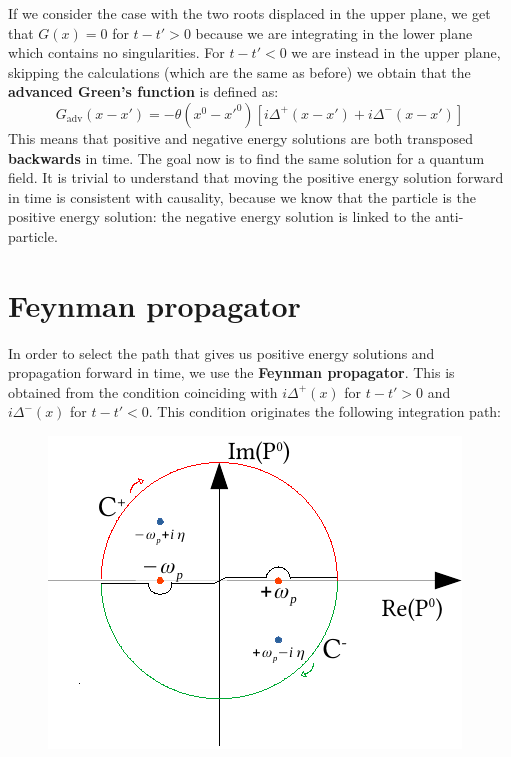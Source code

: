 \documentclass[../main.tex]{subfiles}
\begin{document}
If we consider the case with the two roots displaced in the upper plane, we get that $G(x)=0$ for $t-t'>0$ because we are integrating in the lower plane which contains no singularities. For $t-t'<0$ we are instead in the upper plane, skipping the calculations (which are the same as before) we obtain that the \textbf{advanced Green's function} is defined as:
\[
G_{\text{adv}}(x-x')=-\theta(x^0-x'^0)[i\Delta^+(x-x')+i\Delta^-(x-x')]
\]
This means that positive and negative energy solutions are both transposed \textbf{backwards} in time. The goal now is to find the same solution for a quantum field. It is trivial to understand that moving the positive energy solution forward in time is consistent with causality, because we know that the particle is the positive energy solution: the negative energy solution is linked to the anti-particle.
\section{Feynman propagator}
In order to select the path that gives us positive energy solutions and propagation forward in time, we use the \textbf{Feynman propagator}. This is obtained from the condition coinciding with $i\Delta^+(x)$ for $t-t'>0$ and $i\Delta^-(x)$ for $t-t'<0$. This condition originates the following integration path:
\begin{figure}[h!]
    \centering
    \includegraphics{Images/CamminiIntegrazioneFeynman.pdf}
    \caption*{}
\end{figure}
\end{document}
